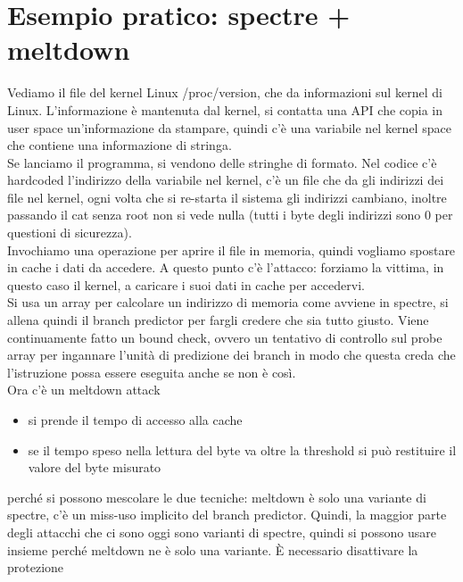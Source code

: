 \documentclass[12pt, oneside]{extbook} %
\begin{document}
\section*{Esempio pratico: spectre + meltdown}
Vediamo il file del kernel Linux \textsf{/proc/version}, che da informazioni sul kernel di Linux. L'informazione è mantenuta dal kernel, si contatta una API che copia in user space un'informazione da stampare, quindi c'è una variabile nel kernel space che contiene una informazione di stringa.\\Se lanciamo il programma, si vendono delle stringhe di formato. Nel codice c'è hardcoded l'indirizzo della variabile nel kernel, c'è un file che da gli indirizzi dei file nel kernel, ogni volta che si re-starta il sistema gli indirizzi cambiano, inoltre passando il cat senza root non si vede nulla (tutti i byte degli indirizzi sono 0 per questioni di sicurezza).\\ Invochiamo una operazione per aprire il file in memoria, quindi vogliamo spostare in cache i dati da accedere. A questo punto c'è l'attacco: forziamo la vittima, in questo caso il kernel, a caricare i suoi dati in cache per accedervi.\\Si usa un array per calcolare un indirizzo di memoria come avviene in spectre, si allena quindi il branch predictor per fargli credere che sia tutto giusto. Viene continuamente fatto un bound check, ovvero un tentativo di controllo sul probe array per ingannare l'unità di predizione dei branch in modo che questa creda che l'istruzione possa essere eseguita anche se non è così.\\Ora c'è un meltdown attack
\begin{itemize}
\item si prende il tempo di accesso alla cache
\item se il tempo speso nella lettura del byte va oltre la threshold si può restituire il valore del byte misurato
\end{itemize}
perché si possono mescolare le due tecniche: meltdown è solo una variante di spectre, c'è un miss-uso implicito del branch predictor. Quindi, la maggior parte degli attacchi che ci sono oggi sono varianti di spectre, quindi si possono usare insieme perché meltdown ne è solo una variante. È necessario disattivare la protezione
\end{document}
